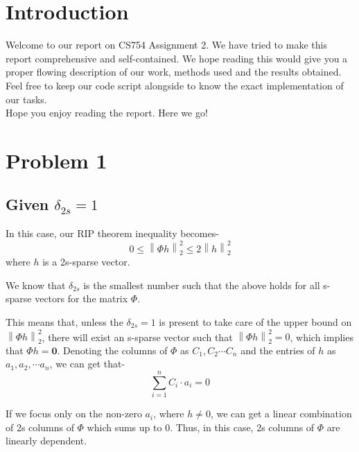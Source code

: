 \documentclass[a4paper,11pt]{article}
\numberwithin{definition}{section}
\numberwithin{mytheorem}{subsection}
\newcommand\norm[1]{\left\lVert#1\right\rVert}
\begin{document}

\date{Spring 2022}
\maketitle

\justifying
\tableofcontents

\newpage
\justifying
\section*{Introduction}

Welcome  to our report on CS754 Assignment 2. We have tried to make this report comprehensive and self-contained. We hope reading this would give you a proper flowing description of our work, methods used and the results obtained. Feel free to keep our code script alongside to know the exact implementation of our tasks. \\


Hope you enjoy reading the report. Here we go!


\section{Problem 1}



\subsection{Given $\delta_{2s}=1$}

In this case, our RIP theorem inequality becomes-
$$0 \leq \norm{\Phi h}_2^2 \leq 2 \norm{h}_2^2$$
where $h$ is a 2s-sparse vector.

We know that $\delta_{2s}$ is the smallest number such that the above holds for all s-sparse vectors for the matrix $\Phi$.

This means that, unless the $\delta_{2s}=1$ is present to take care of the upper bound on $\norm{\Phi h}_2^2$, there will exist an s-sparse vector such that $\norm{\Phi h}_2^2=0$, which implies that $\Phi h =\boldsymbol{0}$. Denoting the columns of $\Phi$ as $C_1, C_2 \cdots C_n$ and the entries of $h$ as $a_1, a_2, \cdots a_n$, we can get that-
$$ \sum_{i=1}^n C_i \cdot a_i = 0 $$

If we focus only on the non-zero $a_i$, where $h \neq 0$, we can get a linear combination of 2s columns of $\Phi$ which sums up to 0. Thus, in this case, 2s columns of $\Phi$ are linearly dependent.
\end{document}

